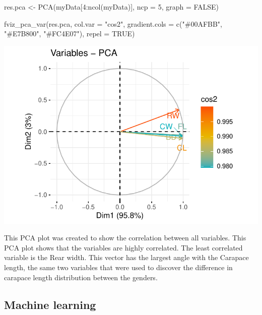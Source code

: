 \documentclass[
]{article}
\newenvironment{Shaded}{}{}
\newcommand{\AttributeTok}[1]{#1}
\newcommand{\ConstantTok}[1]{#1}
\newcommand{\DecValTok}[1]{#1}
\newcommand{\FunctionTok}[1]{#1}
\newcommand{\NormalTok}[1]{#1}
\newcommand{\OtherTok}[1]{\textcolor[rgb]{1.00,0.25,0.00}{#1}}
\newcommand{\SpecialCharTok}[1]{\textcolor[rgb]{0.00,0.50,0.50}{#1}}
\newcommand{\StringTok}[1]{\textcolor[rgb]{0.00,0.50,0.50}{#1}}
\begin{document}
\begin{Shaded}
\begin{Highlighting}[]
\NormalTok{res.pca }\OtherTok{\textless{}{-}} \FunctionTok{PCA}\NormalTok{(myData[}\DecValTok{4}\SpecialCharTok{:}\FunctionTok{ncol}\NormalTok{(myData)], }\AttributeTok{ncp =} \DecValTok{5}\NormalTok{, }\AttributeTok{graph =} \ConstantTok{FALSE}\NormalTok{)}

\FunctionTok{fviz\_pca\_var}\NormalTok{(res.pca, }\AttributeTok{col.var =} \StringTok{"cos2"}\NormalTok{,}
             \AttributeTok{gradient.cols =} \FunctionTok{c}\NormalTok{(}\StringTok{"\#00AFBB"}\NormalTok{, }\StringTok{"\#E7B800"}\NormalTok{, }\StringTok{"\#FC4E07"}\NormalTok{), }
             \AttributeTok{repel =} \ConstantTok{TRUE}\NormalTok{)}
\end{Highlighting}
\end{Shaded}

\begin{center}\includegraphics{Log_files/figure-latex/pca-1} \end{center}

This PCA plot was created to show the correlation between all variables.
This PCA plot shows that the variables are highly correlated. The least
correlated variable is the Rear width. This vector has the largest angle
with the Carapace length, the same two variables that were used to
discover the difference in carapace length distribution between the
genders.

\newpage

\hypertarget{machine-learning}{%
\subsection{Machine learning}\label{machine-learning}}
\end{document}
